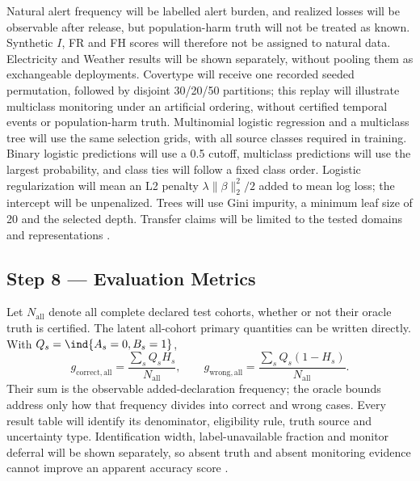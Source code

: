 Natural alert frequency will be labelled alert burden, and realized losses will be observable after release, but population-harm truth will not be treated as known. Synthetic $I$, FR and FH scores will therefore not be assigned to natural data. Electricity and Weather results will be shown separately, without pooling them as exchangeable deployments. Covertype will receive one recorded seeded permutation, followed by disjoint 30/20/50 partitions; this replay will illustrate multiclass monitoring under an artificial ordering, without certified temporal events or population-harm truth. Multinomial logistic regression and a multiclass tree will use the same selection grids, with all source classes required in training. Binary logistic predictions will use a 0.5 cutoff, multiclass predictions will use the largest probability, and class ties will follow a fixed class order. Logistic regularization will mean an L2 penalty $\lambda\|\beta\|_2^2/2$ added to mean log loss; the intercept will be unpenalized. Trees will use Gini impurity, a minimum leaf size of 20 and the selected depth. Transfer claims will be limited to the tested domains and representations \cite{souza}.

\subsection*{Step 8 --- Evaluation Metrics}
Let $N_{\mathrm{all}}$ denote all complete declared test cohorts, whether or not their oracle truth is certified. The latent all-cohort primary quantities can be written directly. With $Q_s=\ind\{A_s=0,B_s=1\}$,
\begin{equation}
g_{\mathrm{correct,all}}=\frac{\sum_s Q_sH_s}{N_{\mathrm{all}}},\qquad
g_{\mathrm{wrong,all}}=\frac{\sum_s Q_s(1-H_s)}{N_{\mathrm{all}}}.
\end{equation}
Their sum is the observable added-declaration frequency; the oracle bounds address only how that frequency divides into correct and wrong cases. Every result table will identify its denominator, eligibility rule, truth source and uncertainty type. Identification width, label-unavailable fraction and monitor deferral will be shown separately, so absent truth and absent monitoring evidence cannot improve an apparent accuracy score \cite{hoeffding,selective}.

